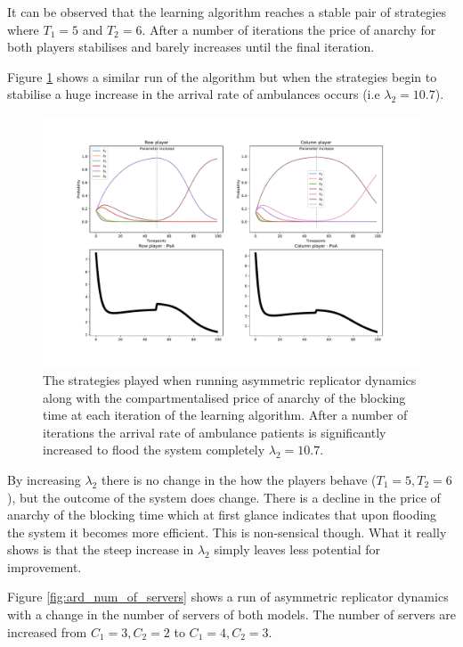 It can be observed that the learning algorithm reaches a stable pair of 
strategies where \(T_1 = 5\) and \(T_2 = 6\). After a number of iterations the
price of anarchy for both players stabilises and barely increases until the 
final iteration. 

Figure \ref{fig:ard_lambda_2} shows a similar run of the
algorithm but when the strategies begin to stabilise a huge increase in the
arrival rate of ambulances occurs (i.e \( \lambda_2 = 10.7 \)).


\begin{figure}[H]
    \includegraphics[width=\textwidth, trim=0 400 0 0]{imgs/asymmetric_rd_and_PoA/asymmetric_flooding.pdf}
    \caption{The strategies played when running asymmetric replicator dynamics
    along with the compartmentalised price of anarchy of the blocking time at
    each iteration of the learning algorithm. After a number of iterations the 
    arrival rate of ambulance patients is significantly increased to flood the
    system completely \( \lambda_2 = 10.7 \).}
    \label{fig:ard_lambda_2}
\end{figure}


By increasing \(\lambda_2\) there is no change in the how the players behave
(\(T_1 = 5, T_2 = 6\)), but the outcome of the system does change. 
There is a decline in the price of anarchy of the blocking time which at first 
glance indicates that upon flooding the system it becomes more efficient. 
This is non-sensical though.
What it really shows is that the steep increase in \( \lambda_2 \) simply leaves 
less potential for improvement. 

Figure \ref{fig:ard_num_of_servers} shows a run of asymmetric replicator 
dynamics with a change in the number of servers of both models.
The number of servers are increased from \(C_1 = 3, C_2 = 2\) to 
\(C_1 = 4, C_2 = 3\).


